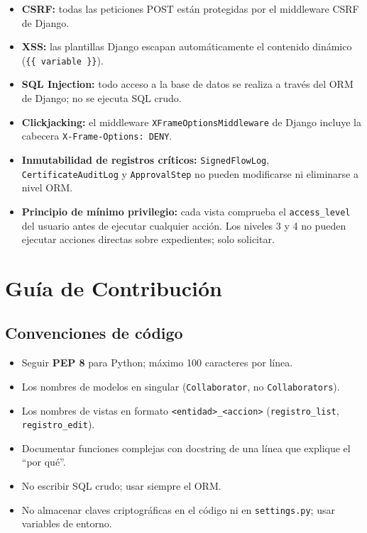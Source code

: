 \documentclass[10pt,letterpaper]{report}
\begin{document}
\begin{itemize}[leftmargin=*]
    \item \textbf{CSRF:} todas las peticiones POST están protegidas por el middleware CSRF de Django.
    \item \textbf{XSS:} las plantillas Django escapan automáticamente el contenido dinámico (\texttt{\{\{ variable \}\}}).
    \item \textbf{SQL Injection:} todo acceso a la base de datos se realiza a través del ORM de Django; no se ejecuta SQL crudo.
    \item \textbf{Clickjacking:} el middleware \texttt{XFrameOptionsMiddleware} de Django incluye la cabecera \texttt{X-Frame-Options: DENY}.
    \item \textbf{Inmutabilidad de registros críticos:} \texttt{SignedFlowLog}, \texttt{CertificateAuditLog} y \texttt{ApprovalStep} no pueden modificarse ni eliminarse a nivel ORM.
    \item \textbf{Principio de mínimo privilegio:} cada vista comprueba el \texttt{access\_level} del usuario antes de ejecutar cualquier acción. Los niveles 3 y 4 no pueden ejecutar acciones directas sobre expedientes; solo solicitar.
\end{itemize}

\chapter{Guía de Contribución}

\section{Convenciones de código}

\begin{itemize}[leftmargin=*]
    \item Seguir \textbf{PEP 8} para Python; máximo 100 caracteres por línea.
    \item Los nombres de modelos en singular (\texttt{Collaborator}, no \texttt{Collaborators}).
    \item Los nombres de vistas en formato \texttt{<entidad>\_<accion>} (\texttt{registro\_list}, \texttt{registro\_edit}).
    \item Documentar funciones complejas con docstring de una línea que explique el ``por qué''.
    \item No escribir SQL crudo; usar siempre el ORM.
    \item No almacenar claves criptográficas en el código ni en \texttt{settings.py}; usar variables de entorno.
\end{itemize}
\end{document}
